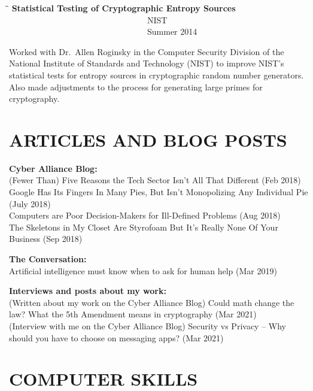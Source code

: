 \documentclass{res}
\begin{document}
\begin{resume}
	\begin{tabbing}
	\hspace{3in}\=  \hspace{1.63in}\= \kill %
	{\bf Statistical Testing of Cryptographic Entropy Sources} \>~~~~~~~~~~~~~~~~~~~~~~~~~~~~~~~~~NIST 
 \>~~~~~~~~~~~~~~~~~~~~~~~~~~~~~~~~~Summer 2014\\      
	\end{tabbing} \vspace{-30pt}
	Worked with Dr.~Allen Roginsky in the Computer Security Division of the National Institute of Standards and Technology (NIST) to improve NIST's statistical tests for entropy sources in cryptographic random number generators.  Also made adjustments to the process for generating large primes for cryptography.
\\




\section{ARTICLES AND BLOG POSTS}  
\vspace{0.1in}

\textbf{Cyber Alliance Blog:} \\         
    (Fewer Than) Five Reasons the Tech Sector Isn't All That Different (Feb 2018) \\
    Google Has Its Fingers In Many Pies, But Isn't Monopolizing Any Individual Pie (July 2018) \\
    Computers are Poor Decision-Makers for Ill-Defined Problems (Aug 2018) \\
    The Skeletons in My Closet Are Styrofoam But It's Really None Of Your Business (Sep 2018) 

\textbf{The Conversation:} \\         
    Artificial intelligence must know when to ask for human help (Mar 2019) 

\textbf{Interviews and posts about my work:} \\
    (Written about my work on the Cyber Alliance Blog) Could math change the law? What the 5th Amendment means in cryptography (Mar 2021) \\
    (Interview with me on the Cyber Alliance Blog) Security vs Privacy -- Why should you have to choose on messaging apps? (Mar 2021) \\




\section{COMPUTER SKILLS}  
\vspace{0.1in}


\end{resume}
\end{document}
